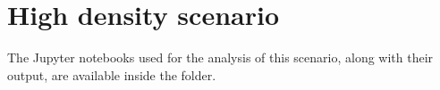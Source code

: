 \section{High density scenario}\label{sec:high-density}

The Jupyter notebooks used for the analysis of this scenario, along with their
output, are available inside the  folder.




